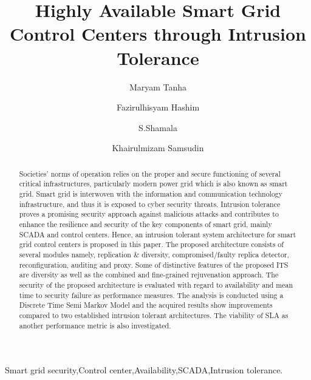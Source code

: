 \documentclass[preprint,number,12pt]{elsarticle}
\begin{document}
\begin{frontmatter}





\title{Highly Available Smart Grid Control Centers through Intrusion Tolerance}




\author[a]{Maryam Tanha}
\author[a]{Fazirulhisyam Hashim}
\author[b]{S.Shamala}
\author[a]{Khairulmizam Samsudin}
\address[a]{Faculty of Engineering, Universiti Putra Malaysia, Malaysia}
\address[b]{Faculty of Computer Science and Information Technology,  Universiti Putra Malaysia, Malaysia}

\begin{abstract}
Societies' norms of operation relies on the proper and secure functioning of several critical infrastructures, particularly modern power grid which is also known as smart grid. Smart grid is interwoven with the information and communication technology infrastructure, and thus it is exposed to cyber security threats. Intrusion tolerance proves a promising security approach against malicious attacks and contributes to enhance the resilience and security of the key components of smart grid, mainly SCADA and control centers. Hence, an intrusion tolerant system architecture for smart grid control centers is proposed in this paper. The proposed architecture consists of several modules namely, replication \& diversity, compromised/faulty replica detector, reconfiguration, auditing and proxy. Some of distinctive features of the proposed ITS are diversity as well as the combined and fine-grained rejuvenation approach. The security of the proposed architecture is evaluated with regard to availability and mean time to security failure as performance measures. The analysis is conducted using a Discrete Time Semi Markov Model and the acquired results show improvements compared to two established intrusion tolerant architectures. The viability of SLA as another performance metric is also investigated.
\end{abstract}

\begin{keyword}
Smart grid security\sep Control center\sep Availability\sep SCADA\sep Intrusion tolerance.

\end{keyword}

\end{frontmatter}
\end{document}
